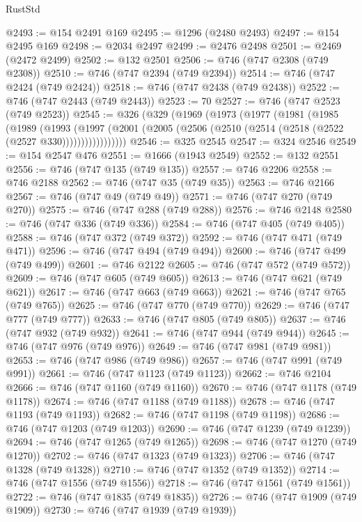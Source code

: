 \begin{lexlean}{RustStd}
\begin{coremodule}
{\begin{coremodule}
{{{{{{{{{{{{{{{{{{{{{{{{{{{{{{{{{{{{{{{{{{{{{{{{{{{{{{{{{{{{{{{{{{{{{{{{{{{{{{{{@2493 := @154 @2491 @169
@2495 := @1296 (@2480 @2493)
@2497 := @154 @2495 @169
@2498 := @2034 @2497
@2499 := @2476 @2498
@2501 := @2469 (@2472 @2499)
@2502 := @132 @2501
@2506 := @746 (@747 @2308 (@749 @2308))
@2510 := @746 (@747 @2394 (@749 @2394))
@2514 := @746 (@747 @2424 (@749 @2424))
@2518 := @746 (@747 @2438 (@749 @2438))
@2522 := @746 (@747 @2443 (@749 @2443))
@2523 := 70
@2527 := @746 (@747 @2523 (@749 @2523))
@2545 := @326
    (@329
      (@1969
        (@1973
          (@1977
            (@1981
              (@1985
                (@1989
                  (@1993
                    (@1997
                      (@2001 (@2005 (@2506 (@2510 (@2514 (@2518 (@2522 (@2527 @330)))))))))))))))))
@2546 := @325 @2545
@2547 := @324 @2546
@2549 := @154 @2547 @476
@2551 := @1666 (@1943 @2549)
@2552 := @132 @2551
@2556 := @746 (@747 @135 (@749 @135))
@2557 := @746 @2206
@2558 := @746 @2188
@2562 := @746 (@747 @35 (@749 @35))
@2563 := @746 @2166
@2567 := @746 (@747 @49 (@749 @49))
@2571 := @746 (@747 @270 (@749 @270))
@2575 := @746 (@747 @288 (@749 @288))
@2576 := @746 @2148
@2580 := @746 (@747 @336 (@749 @336))
@2584 := @746 (@747 @405 (@749 @405))
@2588 := @746 (@747 @372 (@749 @372))
@2592 := @746 (@747 @471 (@749 @471))
@2596 := @746 (@747 @494 (@749 @494))
@2600 := @746 (@747 @499 (@749 @499))
@2601 := @746 @2122
@2605 := @746 (@747 @572 (@749 @572))
@2609 := @746 (@747 @605 (@749 @605))
@2613 := @746 (@747 @621 (@749 @621))
@2617 := @746 (@747 @663 (@749 @663))
@2621 := @746 (@747 @765 (@749 @765))
@2625 := @746 (@747 @770 (@749 @770))
@2629 := @746 (@747 @777 (@749 @777))
@2633 := @746 (@747 @805 (@749 @805))
@2637 := @746 (@747 @932 (@749 @932))
@2641 := @746 (@747 @944 (@749 @944))
@2645 := @746 (@747 @976 (@749 @976))
@2649 := @746 (@747 @981 (@749 @981))
@2653 := @746 (@747 @986 (@749 @986))
@2657 := @746 (@747 @991 (@749 @991))
@2661 := @746 (@747 @1123 (@749 @1123))
@2662 := @746 @2104
@2666 := @746 (@747 @1160 (@749 @1160))
@2670 := @746 (@747 @1178 (@749 @1178))
@2674 := @746 (@747 @1188 (@749 @1188))
@2678 := @746 (@747 @1193 (@749 @1193))
@2682 := @746 (@747 @1198 (@749 @1198))
@2686 := @746 (@747 @1203 (@749 @1203))
@2690 := @746 (@747 @1239 (@749 @1239))
@2694 := @746 (@747 @1265 (@749 @1265))
@2698 := @746 (@747 @1270 (@749 @1270))
@2702 := @746 (@747 @1323 (@749 @1323))
@2706 := @746 (@747 @1328 (@749 @1328))
@2710 := @746 (@747 @1352 (@749 @1352))
@2714 := @746 (@747 @1556 (@749 @1556))
@2718 := @746 (@747 @1561 (@749 @1561))
@2722 := @746 (@747 @1835 (@749 @1835))
@2726 := @746 (@747 @1909 (@749 @1909))
@2730 := @746 (@747 @1939 (@749 @1939))
}}}}}}}}}}}}}}}}}}}}}}}}}}}}}}}}}}}}}}}}}}}}}}}}}}}}}}}}}}}}}}}}}}}}}}}}}}}}}}}}
\end{coremodule}}
\end{coremodule}
\end{lexlean}
